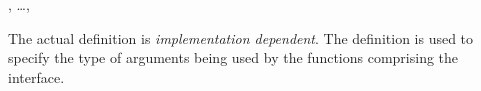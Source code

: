 \documentclass[../Floating-Point-Environment.tex]{subfiles}
\begin{document}

\DSupertypes{}

, \ldots, 

\DDescription{}

The actual  definition is
\emph{implementation dependent}.  The definition is used to specify
the type of arguments being used by the functions comprising the
interface.
\end{document}
